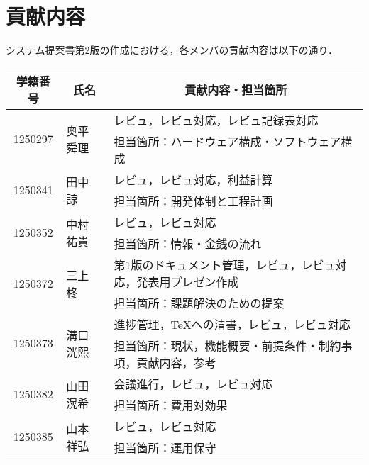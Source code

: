 \chapter{貢献内容}
システム提案書第2版の作成における，各メンバの貢献内容は以下の通り．
\begin{table}[h]
    \centering
    \begin{tabularx}{\textwidth}{cll}
        \multicolumn{1}{c}{学籍番号} & \multicolumn{1}{c}{氏名} & \multicolumn{1}{c}{貢献内容・担当箇所}    \\
        \hline
        \multirow{2}{*}{1250297} & \multirow{2}{*}{奥平 舜理} & レビュ，レビュ対応，レビュ記録表対応               \\
                                 &                        & 担当箇所：ハードウェア構成・ソフトウェア構成           \\
        \hline
        \multirow{2}{*}{1250341} & \multirow{2}{*}{田中 諒}  & レビュ，レビュ対応，利益計算                   \\
                                 &                        & 担当箇所：開発体制と工程計画                   \\
        \hline
        \multirow{2}{*}{1250352} & \multirow{2}{*}{中村 祐貴} & レビュ，レビュ対応                        \\
                                 &                        & 担当箇所：情報・金銭の流れ                    \\
        \hline
        \multirow{2}{*}{1250372} & \multirow{2}{*}{三上 柊}  & 第1版のドキュメント管理，レビュ，レビュ対応，発表用プレゼン作成 \\
                                 &                        & 担当箇所：課題解決のための提案                  \\
        \hline
        \multirow{2}{*}{1250373} & \multirow{2}{*}{溝口 洸熙} & 進捗管理，\TeX への清書，レビュ，レビュ対応         \\
                                 &                        & 担当箇所：現状，機能概要・前提条件・制約事項，貢献内容，参考   \\
        \hline
        \multirow{2}{*}{1250382} & \multirow{2}{*}{山田 滉希} & 会議進行，レビュ，レビュ対応                   \\
                                 &                        & 担当箇所：費用対効果                       \\
        \hline
        \multirow{2}{*}{1250385} & \multirow{2}{*}{山本 祥弘} & レビュ，レビュ対応                        \\
                                 &                        & 担当箇所：運用保守                        \\
        \hline
    \end{tabularx}
\end{table}